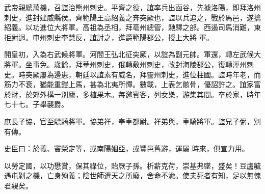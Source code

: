 \begin{pinyinscope}
 武帝親總萬機，召誼治熊州刺史。平齊之役，誼率兵出函谷，先據洛陽，即拜洛州刺史，進封建威縣侯。齊範陽王高紹義之奔突厥也，誼以兵追之，戰於馬邑，遂擒紹義。以功進位大將軍。高祖為丞相，拜亳州總管，馳驛之部。西遏司馬消難，東拒尉迥。申州刺史李慧反，誼討之，進爵範陽郡公，授上大將
 軍。



 開皇初，入為右武候將軍。河間王弘北征突厥，以誼為副元帥。軍還，轉左武候大將軍。坐事免。歲餘，拜華州刺史，俄轉敷州刺史，改封海陵郡公，復轉涇州刺史。時突厥屢為邊患，朝廷以誼素有威名，拜靈州刺史，進位柱國。誼時年老，而筋力不衰，猶能重鎧上馬，甚為北夷所憚。數載，上表乞骸骨，優詔許之。誼家富於財，於郊外構一別廬，多植果木。每邀賓客，列女樂，游集其間。卒於家，時年七十七。子舉襲爵。



 庶長子協，官至驃騎將軍。協弟祥，奉車都尉。祥弟與，車騎將軍。誼兄子弼，別有傳。



 史臣曰：於義、竇榮定等，或南陽姻亞，或豐邑舊游，運屬
 時來，俱宣力用。



 以勞定國，以功懋賞，保其祿位，貽厥子孫。析薪克荷，崇基弗墜，盛矣！豆盧毓遇屯剝之機，亡身殉義；陰世師遭天之所廢，舍命不渝。使夫死者有知，足以無愧君親矣。



\end{pinyinscope}
